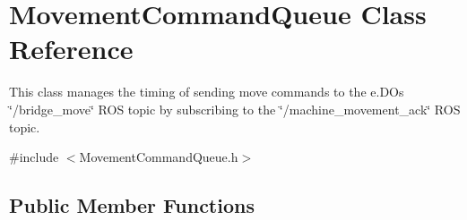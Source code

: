 \hypertarget{classMovementCommandQueue}{}\section{Movement\+Command\+Queue Class Reference}
\label{classMovementCommandQueue}


This class manages the timing of sending move commands to the e.\+DO\textquotesingle{}s \char`\"{}/bridge\+\_\+move\char`\"{} R\+OS topic by subscribing to the \char`\"{}/machine\+\_\+movement\+\_\+ack\char`\"{} R\+OS topic.  




{\ttfamily \#include $<$Movement\+Command\+Queue.\+h$>$}

\subsection*{Public Member Functions}

